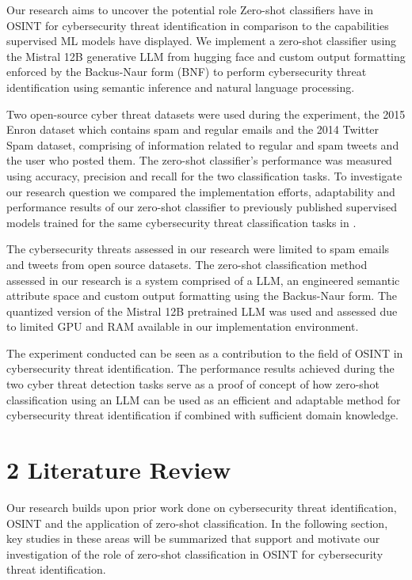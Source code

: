 \documentclass[letterpaper,twocolumn,fleqn]{article}
\begin{document}
Our research aims to uncover the potential role Zero-shot classifiers have in OSINT for cybersecurity threat identification in comparison to the capabilities supervised ML models have displayed. We implement a zero-shot classifier using the Mistral 12B generative LLM\cite{aiMistralNeMo2024} from hugging face and custom output formatting enforced by the Backus-Naur form (BNF) to perform cybersecurity threat identification using semantic inference and natural language processing. 

Two open-source cyber threat datasets were used during the experiment, the 2015 Enron dataset which contains spam and regular emails and the 2014 Twitter Spam dataset, comprising of information related to regular and spam tweets and the user who posted them. 
The zero-shot classifier's performance was measured using accuracy, precision and recall for the two classification tasks\cite{dengImprovedMethodConstruct2016}. 
To investigate our research question we compared the implementation efforts, adaptability and performance results of our zero-shot classifier to previously published supervised models trained for the same cybersecurity threat classification tasks in \cite{shaukatCyberThreatDetection2020}. 

The cybersecurity threats assessed in our research were limited to spam emails and tweets from open source datasets. The zero-shot classification method assessed in our research is a system comprised of a LLM, an engineered semantic attribute space and custom output formatting using the Backus-Naur form. 
The quantized version of the Mistral 12B pretrained LLM was used and assessed due to limited GPU and RAM available in our implementation environment. 

The experiment conducted can be seen as a contribution to the field of OSINT in cybersecurity threat identification. The performance results achieved during the two cyber threat detection tasks serve as a proof of concept of how zero-shot classification using an LLM can be used as an efficient and adaptable method for cybersecurity threat identification if combined with sufficient domain knowledge.

\section{2 Literature Review}
\label{literaturereview}

Our research builds upon prior work done on cybersecurity threat identification, OSINT and the application of zero-shot classification. In the following section, key studies in these areas will be summarized that support and motivate our investigation of the role of zero-shot classification in OSINT for cybersecurity threat identification.
\end{document}
